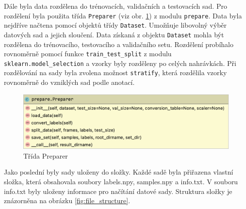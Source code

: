 \documentclass[FM,BP]{tulthesis}
\begin{document}
Dále byla data rozdělena do trénovacích, validačních a testovacích sad. Pro rozdělení byla použita třída \texttt{\mbox{Preparer}} (viz obr. \ref{fig:preparer}) z modulu \texttt{\mbox{prepare}}. Data byla nejdříve načtena pomocí objektů třídy \texttt{\mbox{Dataset}}. Umožňuje libovolný výběr datových sad a jejich sloučení. Data získaná z objektu \texttt{\mbox{Dataset}} mohla být rozdělena do trénovacího, testovacího a validačního setu. Rozdělení probíhalo rovnoměrně pomocí funkce \texttt{\mbox{train\_test\_split}} z modulu \texttt{\mbox{sklearn.model\_selection}} a vzorky byly rozděleny po celých nahrávkách. Při rozdělování na sady byla zvolena možnost \texttt{\mbox{stratify}}, která rozdělila vzorky rovnoměrně do vzniklých sad podle anotací.

\begin{figure}[ht]
\centerline{\includegraphics[scale=.25,keepaspectratio]{prepare.png}}
\caption{Třída Preparer}
\label{fig:preparer}
\end{figure}
\FloatBarrier

Jako poslední byly sady uloženy do složky. Každé sadě byla přiřazena vlastní složka, která obsahovala soubory labels.npy, samples.npy a info.txt. V souboru info.txt byly uloženy informace pro načítání datové sady. Struktura složky je znázorněna na obrázku \mbox{\ref{fig:file_structure}}. 
\end{document}
